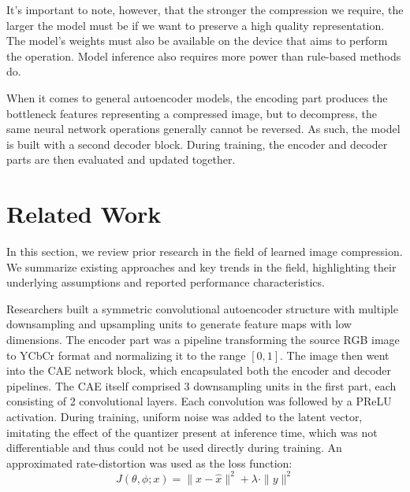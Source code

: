 \documentclass[conference]{IEEEtran}
\begin{document}
It's important to note, however, that the stronger the compression we require, the larger the model must be if we want to preserve a high quality representation. The model's weights must also be available on the device that aims to perform the operation. Model inference also requires more power than rule-based methods do.

When it comes to general autoencoder models, the encoding part produces the bottleneck features representing a compressed image, but to decompress, the same neural network operations generally cannot be reversed. As such, the model is built with a second decoder block. During training, the encoder and decoder parts are then evaluated and updated together.


\section{Related Work}
In this section, we review prior research in the field of learned image compression. We summarize existing approaches and key trends in the field, highlighting their underlying assumptions and reported performance characteristics.

Researchers \cite{cheng_deep_2018} built a symmetric convolutional autoencoder structure with multiple downsampling and upsampling units to generate feature maps with low dimensions. The encoder part was a pipeline transforming the source RGB image to YCbCr format and normalizing it to the range $[0,1]$. The image then went into the CAE network block, which encapsulated both the encoder and decoder pipelines. The CAE itself comprised 3 downsampling units in the first part, each consisting of 2 convolutional layers. Each convolution was followed by a PReLU activation. During training, uniform noise was added to the latent vector, imitating the effect of the quantizer present at inference time, which was not differentiable and thus could not be used directly during training. An approximated rate-distortion was used as the loss function:
\begin{equation}
    J(\theta, \phi; x) = \|x - \hat{x}\|^2 + \lambda \cdot \|y\|^2
    \label{eq:cae_loss}
\end{equation}
\end{document}
